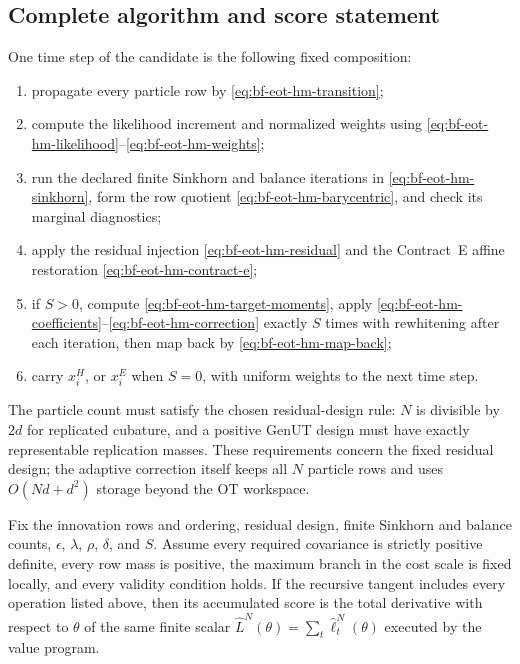 \subsection{Complete algorithm and score statement}

One time step of the candidate is the following fixed composition:
\begin{enumerate}[label=(\arabic*)]
 \item propagate every particle row by \eqref{eq:bf-eot-hm-transition};
 \item compute the likelihood increment and normalized weights using
       \eqref{eq:bf-eot-hm-likelihood}--\eqref{eq:bf-eot-hm-weights};
 \item run the declared finite Sinkhorn and balance iterations in
       \eqref{eq:bf-eot-hm-sinkhorn}, form the row quotient
       \eqref{eq:bf-eot-hm-barycentric}, and check its marginal diagnostics;
 \item apply the residual injection \eqref{eq:bf-eot-hm-residual} and the
       Contract~E affine restoration \eqref{eq:bf-eot-hm-contract-e};
 \item if \(S>0\), compute \eqref{eq:bf-eot-hm-target-moments}, apply
       \eqref{eq:bf-eot-hm-coefficients}--\eqref{eq:bf-eot-hm-correction}
       exactly \(S\) times with rewhitening after each iteration, then map back
       by \eqref{eq:bf-eot-hm-map-back};
 \item carry \(x_i^H\), or \(x_i^E\) when \(S=0\), with uniform weights to
       the next time step.
\end{enumerate}
The particle count must satisfy the chosen residual-design rule: \(N\) is
divisible by \(2d\) for replicated cubature, and a positive GenUT design must
have exactly representable replication masses.  These requirements concern
the fixed residual design; the adaptive correction itself keeps all \(N\)
particle rows and uses \(O(Nd+d^2)\) storage beyond the OT workspace.

\begin{proposition}
\label{prop:bf-eot-hm-score}
Fix the innovation rows and ordering, residual design, finite Sinkhorn and
balance counts, \(\epsilon\), \(\lambda\), \(\rho\), \(\delta\), and \(S\).
Assume every required covariance is strictly positive definite, every row mass
is positive, the maximum branch in the cost scale is fixed locally, and every
validity condition holds.  If the recursive tangent includes every operation
listed above, then its accumulated score is the total derivative with respect
to \(\theta\) of the same finite scalar
\(\widehat L^N(\theta)=\sum_t\widehat\ell_t^N(\theta)\) executed by the value
program.
\end{proposition}

